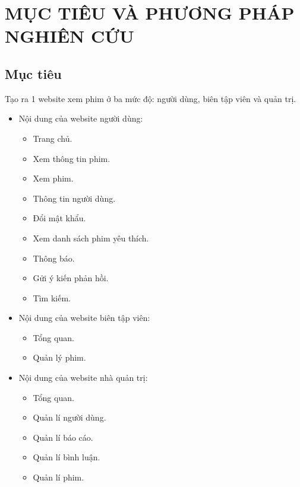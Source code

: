 \section{MỤC TIÊU VÀ PHƯƠNG PHÁP NGHIÊN CỨU}
\subsection{Mục tiêu}
Tạo ra 1 website xem phim ở ba mức độ: người dùng, biên tập viên và quản trị.
\begin{itemize}
    \item Nội dung của website người dùng:
    \begin{itemize}
        \item Trang chủ.
        \item Xem thông tin phim.
        \item Xem phim.
        \item Thông tin người dùng.
        \item Đổi mật khẩu.
        \item Xem danh sách phim yêu thích.
        \item Thông báo.
        \item Gửi ý kiến phản hồi.
        \item Tìm kiếm.
    \end{itemize}
     \item Nội dung của website biên tập viên:
    \begin{itemize}
        \item Tổng quan.
        \item Quản lý phim.
    \end{itemize}
    \item Nội dung của website nhà quản trị:
    \begin{itemize}
        \item Tổng quan.
        \item Quản lí người dùng.
        \item Quản lí báo cáo.
        \item Quản lí bình luận.
        \item Quản lí phim.
    \end{itemize}
\end{itemize}
